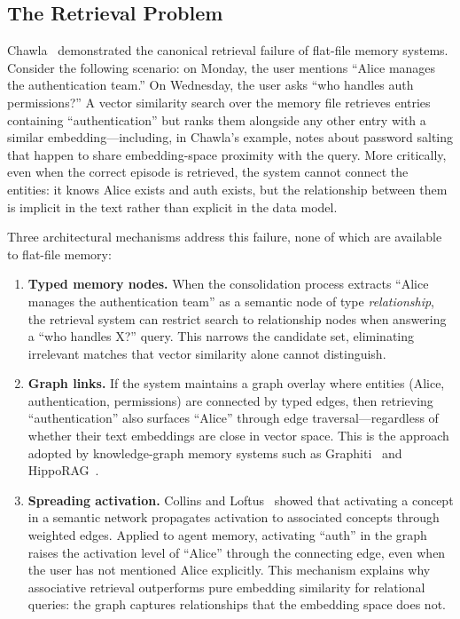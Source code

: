 \subsection{The Retrieval Problem}
\label{sec:memorymd-retrieval}

Chawla~\cite{chawla2026} demonstrated the canonical retrieval failure
of flat-file memory systems.  Consider the following scenario: on Monday,
the user mentions ``Alice manages the authentication team.''  On
Wednesday, the user asks ``who handles auth permissions?''  A vector
similarity search over the memory file retrieves entries containing
``authentication'' but ranks them alongside any other entry with a
similar embedding---including, in Chawla's example, notes about
password salting that happen to share embedding-space proximity with the
query.  More critically, even when the correct episode is retrieved, the
system cannot connect the entities: it knows Alice exists and auth
exists, but the relationship between them is implicit in the text rather
than explicit in the data model.

Three architectural mechanisms address this failure, none of which are
available to flat-file memory:

\begin{enumerate}[leftmargin=*, nosep]
    \item \textbf{Typed memory nodes.}  When the consolidation process
    extracts ``Alice manages the authentication team'' as a semantic
    node of type \emph{relationship}, the retrieval system can restrict
    search to relationship nodes when answering a ``who handles X?''
    query.  This narrows the candidate set, eliminating irrelevant
    matches that vector similarity alone cannot distinguish.

    \item \textbf{Graph links.}  If the system maintains a graph
    overlay where entities (Alice, authentication, permissions) are
    connected by typed edges, then retrieving ``authentication'' also
    surfaces ``Alice'' through edge traversal---regardless of whether
    their text embeddings are close in vector space.  This is the
    approach adopted by knowledge-graph memory systems such as
    Graphiti~\cite{dempsey2025graphiti} and HippoRAG~\cite{gutierrez2024hipporag}.

    \item \textbf{Spreading activation.}  Collins and
    Loftus~\cite{collins1975} showed that activating a concept in a
    semantic network propagates activation to associated concepts through
    weighted edges.  Applied to agent memory, activating ``auth'' in the
    graph raises the activation level of ``Alice'' through the connecting
    edge, even when the user has not mentioned Alice explicitly.  This
    mechanism explains why associative retrieval outperforms pure
    embedding similarity for relational queries: the graph captures
    relationships that the embedding space does not.
\end{enumerate}

